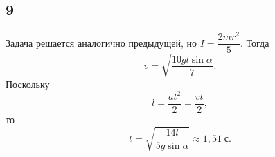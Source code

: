 \subsection{9}

Задача решается аналогично предыдущей, но $I=\dfrac{2mr^2}{5}$. Тогда
\[
v=\sqrt{\frac{10gl\sin\alpha}{7}}.
\]
Поскольку
\[
l=\frac{at^2}{2}=\frac{vt}{2},
\]
то
\[
t=\sqrt{\frac{14l}{5g\sin\alpha}}\approx1{,}51\;\text{с}.
\]